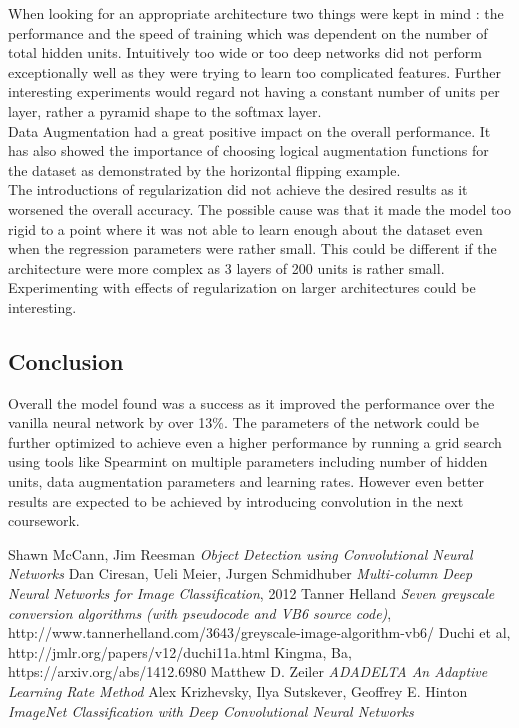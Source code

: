 \documentclass[12pt]{article}
\begin{document}
When looking for an appropriate architecture two things were kept in mind : the performance and the speed of training which was dependent on the number of total hidden units. Intuitively too wide or too deep networks did not perform exceptionally well as they were trying to learn too complicated features. Further interesting experiments would regard not having a constant number of units per layer, rather a pyramid shape to the softmax layer.
\\


Data Augmentation had a great positive impact on the overall performance. It has also showed the importance of choosing logical augmentation functions for the dataset as demonstrated by the horizontal flipping example.
\\

The introductions of regularization did not achieve the desired results as it worsened the overall accuracy. The possible cause was that it made the model too rigid to a point where it was not able to learn enough about the dataset even when the regression parameters were rather small. This could be different if the architecture were more complex as 3 layers of 200 units is rather small. Experimenting with effects of regularization on larger architectures could be interesting.




\subsection*{Conclusion}

Overall the model found was a success as it improved the performance over the vanilla neural network by over 13\%. The parameters of the network could be further optimized to achieve even a higher performance by running a grid search using tools like Spearmint on multiple parameters including number of hidden units, data augmentation parameters and learning rates. However even better results are expected to be achieved by introducing convolution in the next coursework.



\begin{thebibliography}{1}
 Shawn McCann, Jim Reesman {\em Object Detection using Convolutional Neural Networks} 
 Dan Ciresan, Ueli Meier, Jurgen Schmidhuber {\em Multi-column Deep Neural Networks for Image Classification}, 2012
 Tanner Helland {\em Seven greyscale conversion algorithms (with pseudocode and VB6 source code)}, http://www.tannerhelland.com/3643/greyscale-image-algorithm-vb6/
 Duchi et al, http://jmlr.org/papers/v12/duchi11a.html
 Kingma, Ba, https://arxiv.org/abs/1412.6980
 Matthew D. Zeiler {\em ADADELTA An Adaptive Learning Rate Method}
 Alex Krizhevsky, Ilya Sutskever, Geoffrey E. Hinton {\em ImageNet Classification with Deep Convolutional Neural Networks}


\end{thebibliography}
\end{document}
